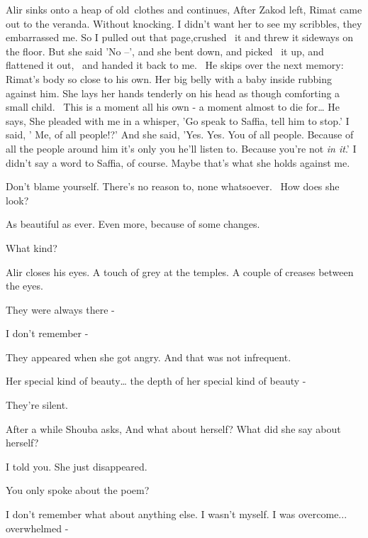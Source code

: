 \documentclass[letterpaper]{article}
\begin{document}
Alir sinks onto a heap of old~clothes and continues, {\textquotedbl}After Zakod left, Rimat came out to the veranda.
Without knocking. I didn't want her to see my scribbles, they embarrassed me. So I pulled out that page,crushed \ it
and threw it sideways on the floor. But she said 'No --', and she bent down, and picked \ it up, and flattened it out,
\ and handed it back to me.{\textquotedbl}~ He skips over the next memory: Rimat's body so close to his own. Her big
belly with a baby inside rubbing against him. She lays her hands tenderly on his head as though comforting a small
child. \ This is a moment all his own - a moment almost to die for{\dots} He says, {\textquotedbl}She pleaded with me
in a whisper, 'Go speak to Saffia, tell him to stop.' I said, ' Me, of all people!?' And she said, 'Yes. Yes. You of
all people. Because of all the people around him it's only you he'll listen to. Because you're not \textit{in it}.' I
didn't say a word to Saffia, of course. Maybe that's what she holds against me.{\textquotedbl} 

{\textquotedbl}Don't blame yourself. There's no reason to, none whatsoever.~ How does she look?{\textquotedbl} 

{\textquotedbl}As beautiful as ever. Even more, because of some changes.{\textquotedbl} 

{\textquotedbl}What kind?{\textquotedbl} 

Alir closes his eyes. {\textquotedbl}A touch of grey at the temples. A couple of creases between the
eyes.{\textquotedbl} 

{\textquotedbl}They were always there -{\textquotedbl}~ 

{\textquotedbl}I don't remember -{\textquotedbl} 

{\textquotedbl}They appeared when she got angry. And that was not infrequent.{\textquotedbl} 

{\textquotedbl}Her special kind of beauty{\dots} the depth of her special kind of beauty -{\textquotedbl} 

They're silent.

After a while Shouba asks, {\textquotedbl}And what about herself? What did she say about herself?{\textquotedbl} 

{\textquotedbl}I told you. She just disappeared.{\textquotedbl} 

{\textquotedbl}You only spoke about the poem?{\textquotedbl} 

{\textquotedbl}I don't remember what about anything else. I wasn't myself. I was overcome... overwhelmed
-{\textquotedbl} 
\end{document}
